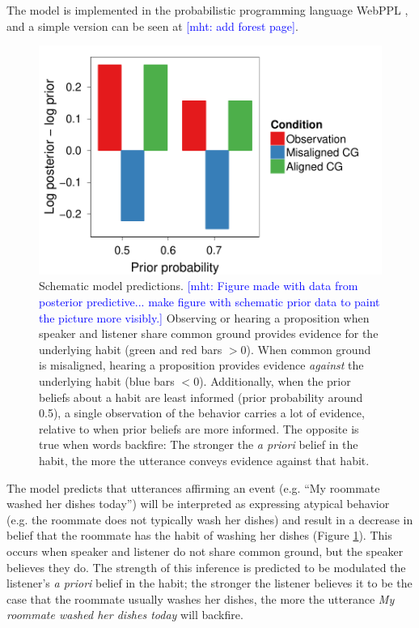 \documentclass[10pt,letterpaper]{article}
\newcommand{\mht}[1]{\textcolor{Blue}{[mht: #1]}}
\begin{document}
The model is implemented in the probabilistic programming language WebPPL \cite{dippl}, and a simple version can be seen at \mht{add forest page}.

\begin{figure}
\centering
    \includegraphics[width=\columnwidth]{schematic-model}
    \caption{Schematic model predictions.
    \mht{Figure made with data from posterior predictive... make figure with schematic prior data to paint the picture more visibly.}
    Observing or hearing a proposition when speaker and listener share common ground provides evidence for the underlying habit (green and red bars $> 0$). 
    When common ground is misaligned, hearing a proposition provides evidence \emph{against} the underlying habit (blue bars $<0$).
    Additionally, when the prior beliefs about a habit are least informed (prior probability around 0.5), a single observation of the behavior carries a lot of evidence, relative to when prior beliefs are more informed. 
    The opposite is true when words backfire: The stronger the \emph{a priori} belief in the habit, the more the utterance conveys evidence against that habit. }
  \label{fig:schematic-model}
\end{figure}


The model predicts that utterances affirming an event (e.g. ``My roommate washed her dishes today'') will be interpreted as expressing atypical behavior (e.g. the roommate does not typically wash her dishes) and result in a decrease in belief that the roommate has the habit of washing her dishes (Figure \ref{fig:schematic-model}).
This occurs when speaker and listener do not share common ground, but the speaker believes they do.
The strength of this inference is predicted to be modulated the listener's \emph{a priori} belief in the habit; the stronger the listener believes it to be the case that the roommate usually washes her dishes, the more the utterance \emph{My roommate washed her dishes today} will backfire. 
\end{document}
